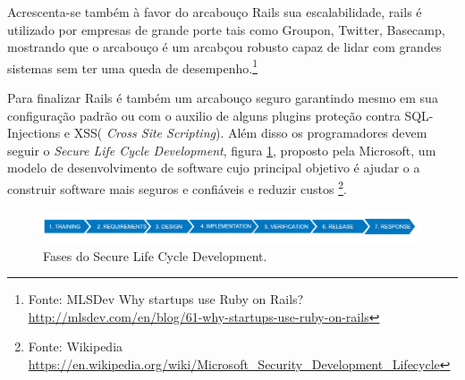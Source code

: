 \par Acrescenta-se também à favor do arcabouço Rails sua escalabilidade, rails é utilizado por empresas de grande porte  tais como Groupon, Twitter, Basecamp, mostrando que o arcabouço é um arcabçou robusto capaz de lidar com grandes sistemas  sem ter uma queda de desempenho.\footnote{Fonte: MLSDev Why startups use Ruby on Rails? \url{http://mlsdev.com/en/blog/61-why-startups-use-ruby-on-rails}}
\par Para finalizar Rails é também um arcabouço seguro garantindo mesmo em sua configuração padrão ou com o auxilio de alguns plugins proteção contra SQL-Injections e XSS( \emph{Cross Site Scripting}). Além disso os programadores devem seguir o \emph{Secure Life Cycle Development}, figura  \ref{fig:security_dev_lifecycle}, proposto pela Microsoft, um modelo de desenvolvimento de software cujo principal objetivo é ajudar o a construir software mais seguros e confiáveis e reduzir custos \footnote{Fonte: Wikipedia \url{https://en.wikipedia.org/wiki/Microsoft_Security_Development_Lifecycle}}.
\begin{figure}[htb]
\includegraphics[width=15cm]{figuras/security_dev_lifecycle}
\caption{\label{fig:security_dev_lifecycle} Fases do Secure Life Cycle Development.}
\end{figure}
